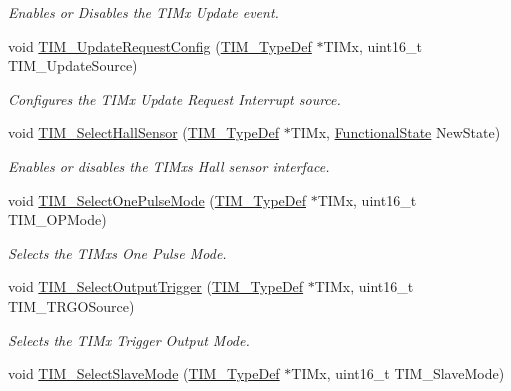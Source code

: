 \begin{DoxyCompactItemize}
\begin{DoxyCompactList}\small\item\em Enables or Disables the T\+I\+Mx Update event. \end{DoxyCompactList}\item 
void \mbox{\hyperlink{group___t_i_m___exported___functions_ga1d7a8f952e209de142499e67a653fc1f}{T\+I\+M\+\_\+\+Update\+Request\+Config}} (\mbox{\hyperlink{struct_t_i_m___type_def}{T\+I\+M\+\_\+\+Type\+Def}} $\ast$T\+I\+Mx, uint16\+\_\+t T\+I\+M\+\_\+\+Update\+Source)
\begin{DoxyCompactList}\small\item\em Configures the T\+I\+Mx Update Request Interrupt source. \end{DoxyCompactList}\item 
void \mbox{\hyperlink{group___t_i_m___exported___functions_ga42c2d1025a3937c9d9f38631af86ffa4}{T\+I\+M\+\_\+\+Select\+Hall\+Sensor}} (\mbox{\hyperlink{struct_t_i_m___type_def}{T\+I\+M\+\_\+\+Type\+Def}} $\ast$T\+I\+Mx, \mbox{\hyperlink{group___exported__types_gac9a7e9a35d2513ec15c3b537aaa4fba1}{Functional\+State}} New\+State)
\begin{DoxyCompactList}\small\item\em Enables or disables the T\+I\+Mx\textquotesingle{}s Hall sensor interface. \end{DoxyCompactList}\item 
void \mbox{\hyperlink{group___t_i_m___exported___functions_gadd2cca5fac6c1291dc4339098d5c9562}{T\+I\+M\+\_\+\+Select\+One\+Pulse\+Mode}} (\mbox{\hyperlink{struct_t_i_m___type_def}{T\+I\+M\+\_\+\+Type\+Def}} $\ast$T\+I\+Mx, uint16\+\_\+t T\+I\+M\+\_\+\+O\+P\+Mode)
\begin{DoxyCompactList}\small\item\em Selects the T\+I\+Mx\textquotesingle{}s One Pulse Mode. \end{DoxyCompactList}\item 
void \mbox{\hyperlink{group___t_i_m___exported___functions_ga28745aaa549e2067e42c19569209e6c6}{T\+I\+M\+\_\+\+Select\+Output\+Trigger}} (\mbox{\hyperlink{struct_t_i_m___type_def}{T\+I\+M\+\_\+\+Type\+Def}} $\ast$T\+I\+Mx, uint16\+\_\+t T\+I\+M\+\_\+\+T\+R\+G\+O\+Source)
\begin{DoxyCompactList}\small\item\em Selects the T\+I\+Mx Trigger Output Mode. \end{DoxyCompactList}\item 
void \mbox{\hyperlink{group___t_i_m___exported___functions_ga2f19ce1d90990691cf037e419ba08003}{T\+I\+M\+\_\+\+Select\+Slave\+Mode}} (\mbox{\hyperlink{struct_t_i_m___type_def}{T\+I\+M\+\_\+\+Type\+Def}} $\ast$T\+I\+Mx, uint16\+\_\+t T\+I\+M\+\_\+\+Slave\+Mode)

\end{DoxyCompactItemize}
